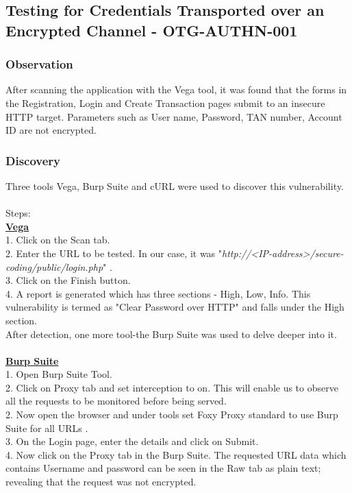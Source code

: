 \subsection{Testing for Credentials Transported over an Encrypted Channel - OTG-AUTHN-001} \label{OTG-AUTHN-001}


\subsubsection{Observation}
After scanning the application with the Vega tool, it was found that the forms in the Registration, Login and Create Transaction pages submit to an insecure HTTP target. Parameters such as User name, Password, TAN number, Account ID are not encrypted. 

\subsubsection{Discovery}
Three tools Vega, Burp Suite and cURL were used to discover this vulnerability.\\\\
Steps: \\
\underline{\textbf{Vega}}\\
1. Click on the Scan tab. \\
2. Enter the URL to be tested. In our case, it was "\textit{http://<IP-address>/secure-coding/public/login.php}" .\\
3. Click on the Finish button. \\
4. A report is generated which has three sections - High, Low, Info. This vulnerability is termed as "Clear Password over HTTP" and falls under the High section.\\
After detection, one more tool-the Burp Suite was used to delve deeper into it.\\ \\
\underline{\textbf{Burp Suite}}\\
1. Open Burp Suite Tool.\\
2. Click on Proxy tab and set  interception to on. This will enable us to observe all the requests to be monitored before being served. \\
2. Now open the browser and under tools set Foxy Proxy standard to use Burp Suite for all URLs .\\
3. On the Login page, enter the details and click on Submit.\\
4. Now click  on the Proxy tab in the Burp Suite. The requested URL data which contains Username and password can be seen in the Raw tab as plain text; revealing that the request was not encrypted. \\
